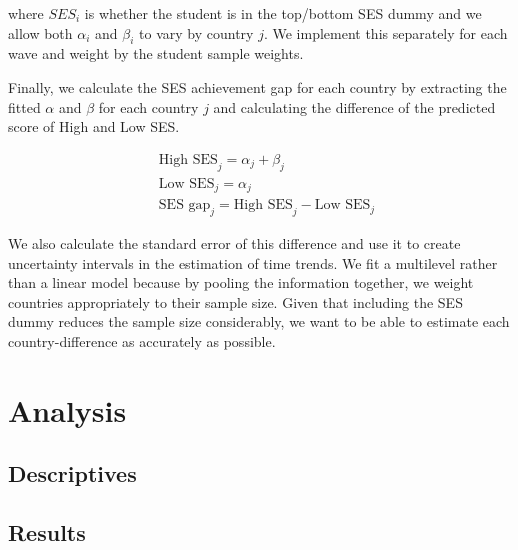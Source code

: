 \documentclass[11pt, a4paper]{article}\usepackage[]{graphicx}\usepackage[]{color}
\begin{document}

where \(SES_i\) is whether the student is in the top/bottom SES dummy and we allow both \(\alpha_i\) and \(\beta_i\) to vary by country \(j\). We implement this separately for each wave and weight by the student sample weights.

Finally, we calculate the SES achievement gap for each country by extracting the fitted \(\alpha\) and \(\beta\) for each country \(j\) and calculating the difference of the predicted score of High and Low SES.

\begin{equation}
\begin{split}
\quad \text{High SES}_j = \alpha_j + \beta_j \\
\quad \text{Low SES}_j = \alpha_j \\
\quad \text{SES gap}_j = \text{High SES}_j - \text{Low SES}_j
\end{split}
\end{equation}

We also calculate the standard error of this difference and use it to create uncertainty intervals in the estimation of time trends. We fit a multilevel rather than a linear model because by pooling the information together, we weight countries appropriately to their sample size. Given that including the SES dummy reduces the sample size considerably, we want to be able to estimate each country-difference as accurately as possible.


\section{Analysis}

\subsection{Descriptives}





\subsection{Results}
\end{document}
